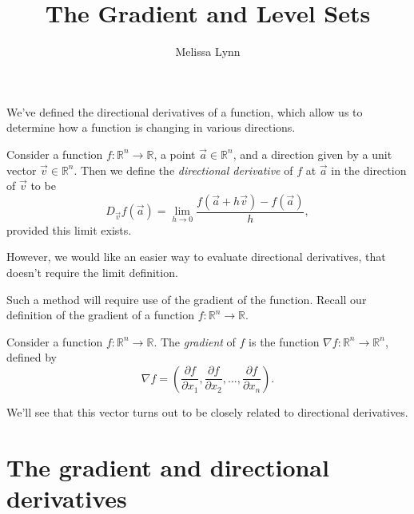 \documentclass{ximera}
\title{The Gradient and Level Sets}
\author{Melissa Lynn}
\begin{document}
\begin{abstract}
\end{abstract}
\maketitle

We've defined the directional derivatives of a function, which allow us to determine how a function is changing in various directions.

\begin{definition}
Consider a function $f:\mathbb{R}^n\rightarrow\mathbb{R}$, a point $\vec{a}\in\mathbb{R}^n$, and a direction given by a unit vector $\vec{v}\in\mathbb{R}^n$. Then we define the \emph{directional derivative} of $f$ at $\vec{a}$ in the direction of $\vec{v}$ to be
\[
D_{\vec{v}}f(\vec{a}) = \lim_{h\rightarrow 0}\frac{f(\vec{a}+h\vec{v})-f(\vec{a})}{h},
\]
provided this limit exists.
\end{definition}

However, we would like an easier way to evaluate directional derivatives, that doesn't require the limit definition.

Such a method will require use of the gradient of the function. Recall our definition of the gradient of a function $f:\mathbb{R}^n\rightarrow\mathbb{R}$.

\begin{definition}
Consider a function $f:\mathbb{R}^n\rightarrow\mathbb{R}$. The \emph{gradient} of $f$ is the function $\nabla f:\mathbb{R}^n\rightarrow\mathbb{R}^n$, defined by
\[
\nabla f = \left(\frac{\partial f}{\partial x_1},\frac{\partial f}{\partial x_2},...,\frac{\partial f}{\partial x_n}\right).
\]
\end{definition}

We'll see that this vector turns out to be closely related to directional derivatives.

\section*{The gradient and directional derivatives}
\end{document}
